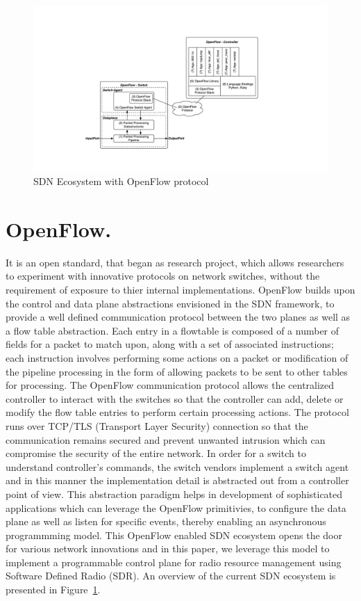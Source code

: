 \begin{figure}[t]
  \centering
  \includegraphics[width=1\textwidth]{figures/OpenFlow.pdf}
  \caption{SDN Ecosystem with OpenFlow protocol}
  \label{fig:OpenFlow}
\end{figure}
\section{OpenFlow.}
It is an open standard, that began as research project, which allows researchers to experiment with innovative protocols on network switches, without the requirement of exposure to thier internal implementations. OpenFlow\cite{openflow} builds upon the control and data plane abstractions envisioned in the SDN framework, to provide a well defined communication protocol between the two planes as well as a flow table abstraction. Each entry in a flowtable is composed of a number of fields for a packet to match upon, along with a set of associated instructions; each instruction involves performing some actions on a packet or modification of the pipeline processing in the form of allowing packets to be sent to other tables for processing. The OpenFlow communication protocol allows the centralized controller to interact with the switches so that the controller can add, delete or modify the flow table entries to perform certain processing actions. The protocol runs over TCP/TLS (Transport Layer Security) connection so that the communication remains secured and prevent unwanted intrusion which can compromise the security of the entire network. In order for a switch to understand controller's commands, the switch vendors implement a switch agent and in this manner the implementation detail is abstracted out from a controller point of view. This abstraction paradigm helps in development of sophisticated applications which can leverage the OpenFlow primitivies, to configure the data plane as well as listen for specific events, thereby enabling an asynchronous programmming model. This OpenFlow enabled SDN ecosystem opens the door for various network innovations and in this paper, we leverage this model to implement a programmable control plane for radio resource management using Software Defined Radio (SDR). An overview of the current SDN ecosystem is presented in Figure~\ref{fig:OpenFlow}.     

